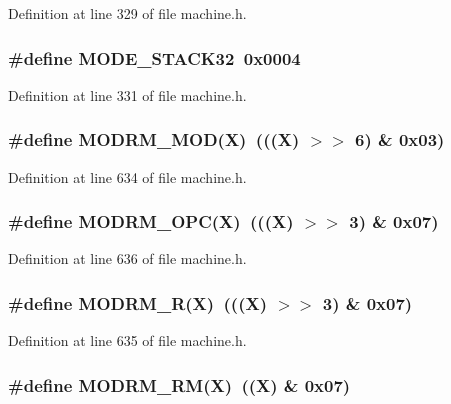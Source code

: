 Definition at line 329 of file machine.h.
\subsubsection[{MODE\_\-STACK32}]{\setlength{\rightskip}{0pt plus 5cm}\#define MODE\_\-STACK32~0x0004}\label{machine_8h_bd331806716ef1f7780dda535a08d9a1}




Definition at line 331 of file machine.h.
\subsubsection[{MODRM\_\-MOD}]{\setlength{\rightskip}{0pt plus 5cm}\#define MODRM\_\-MOD(X)~(((X) $>$$>$ 6) \& 0x03)}\label{machine_8h_00e1deec462c2db0d483108b1b4aeafd}




Definition at line 634 of file machine.h.
\subsubsection[{MODRM\_\-OPC}]{\setlength{\rightskip}{0pt plus 5cm}\#define MODRM\_\-OPC(X)~(((X) $>$$>$ 3) \& 0x07)}\label{machine_8h_0c7c8c2080cd07d493c97ca6107d9af2}




Definition at line 636 of file machine.h.
\subsubsection[{MODRM\_\-R}]{\setlength{\rightskip}{0pt plus 5cm}\#define MODRM\_\-R(X)~(((X) $>$$>$ 3) \& 0x07)}\label{machine_8h_ec437461dace8914816251a5d88c67fc}




Definition at line 635 of file machine.h.
\subsubsection[{MODRM\_\-RM}]{\setlength{\rightskip}{0pt plus 5cm}\#define MODRM\_\-RM(X)~((X) \& 0x07)}\label{machine_8h_ad5cc3552184f5d8ff17e5b747eeba67}




